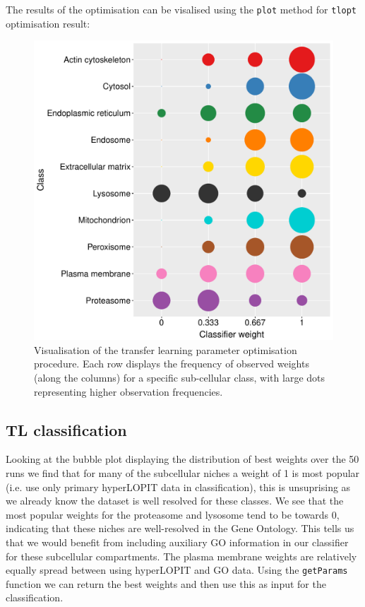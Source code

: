 The results of the optimisation can be visalised using the
\texttt{plot} method for \texttt{tlopt} optimisation result:



\begin{figure}[!ht]
  \centering
\begin{knitrout}
\color{fgcolor}\begin{kframe}
\begin{alltt}
\end{alltt}
\end{kframe}
\includegraphics[width=.6\textwidth]{figure/plottl-1} 

\end{knitrout}
\caption{Visualisation of the transfer learning parameter optimisation
  procedure. Each row displays the frequency of observed weights
  (along the columns) for a specific sub-cellular class, with large
  dots representing higher observation frequencies.}
  \label{fig:plottl}
\end{figure}


\subsection*{TL classification} 

Looking at the bubble plot displaying the distribution of best weights
over the 50 runs we find that for many of the subcellular niches a
weight of 1 is most popular (i.e. use only primary hyperLOPIT data in
classification), this is unsuprising as we already know the dataset is
well resolved for these classes. We see that the most popular weights
for the proteasome and lysosome tend to be towards 0, indicating that
these niches are well-resolved in the Gene Ontology. This tells us
that we would benefit from including auxiliary GO information in our
classifier for these subcellular compartments. The plasma membrane
weights are relatively equally spread between using hyperLOPIT and GO
data. Using the \texttt{getParams} function we can return the best
weights and then use this as input for the classification.

